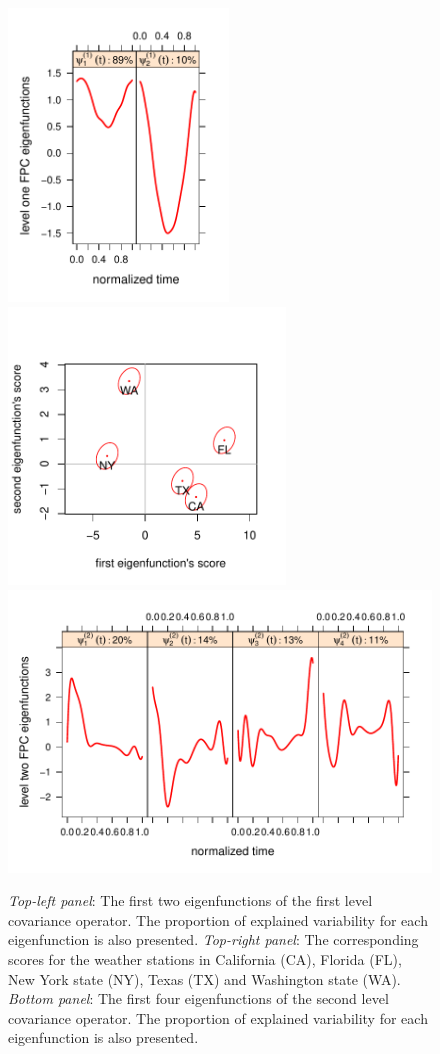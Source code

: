 \documentclass[ba]{imsart}
\numberwithin{equation}{section}
\theoremstyle{plain}
\begin{document}
\begin{figure}
	\centering
	\includegraphics[width=2.3in]{images/us_ml_bf_1.pdf}
	\includegraphics[width=2.9in]{images/us_scores_1.pdf} \\
	\includegraphics[width=5in]{images/us_ml_bf_2.pdf}
\caption{
	\emph{Top-left panel}: The first two eigenfunctions of the first level covariance operator. The proportion of explained
	variability for each eigenfunction is also presented.
	\emph{Top-right panel}: The corresponding scores for the weather stations in California (CA), Florida (FL), New York state (NY),
	Texas (TX) and Washington state (WA).
	\emph{Bottom panel}: The first four eigenfunctions of the second level covariance operator. The proportion of explained
	variability for each eigenfunction is also presented.
}
\label{fig:us_weather_data_L1}
\end{figure}
\end{document}
